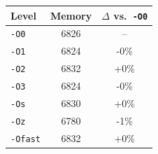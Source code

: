 \begin{tabular*}{\columnwidth}{@{\extracolsep\fill}lcc@{\extracolsep\fill}}
\toprule
\textbf{Level} & \textbf{Memory} & \textbf{$\Delta$ vs.\ \texttt{-O0}} \\
\midrule
\texttt{-O0} & 6826 & -- \\
\texttt{-O1} & 6824 & -0\% \\
\texttt{-O2} & 6832 & +0\% \\
\texttt{-O3} & 6824 & -0\% \\
\texttt{-Os} & 6830 & +0\% \\
\texttt{-Oz} & 6780 & -1\% \\
\texttt{-Ofast} & 6832 & +0\% \\
\bottomrule
\end{tabular*}
